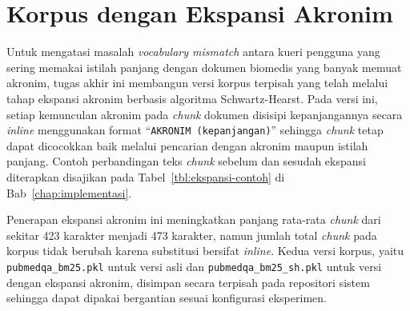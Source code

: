 \section{Korpus dengan Ekspansi Akronim}
\label{lamp:korpus-ekspansi}

Untuk mengatasi masalah \textit{vocabulary mismatch} antara kueri pengguna yang sering memakai istilah panjang dengan dokumen biomedis yang banyak memuat akronim, tugas akhir ini membangun versi korpus terpisah yang telah melalui tahap ekspansi akronim berbasis algoritma Schwartz-Hearst. Pada versi ini, setiap kemunculan akronim pada \textit{chunk} dokumen disisipi kepanjangannya secara \textit{inline} menggunakan format ``\texttt{AKRONIM (kepanjangan)}'' sehingga \textit{chunk} tetap dapat dicocokkan baik melalui pencarian dengan akronim maupun istilah panjang. Contoh perbandingan teks \textit{chunk} sebelum dan sesudah ekspansi diterapkan disajikan pada Tabel~\ref{tbl:ekspansi-contoh} di Bab~\ref{chap:implementasi}.

Penerapan ekspansi akronim ini meningkatkan panjang rata-rata \textit{chunk} dari sekitar 423 karakter menjadi 473 karakter, namun jumlah total \textit{chunk} pada korpus tidak berubah karena substitusi bersifat \textit{inline}. Kedua versi korpus, yaitu \texttt{pubmedqa\_bm25.pkl} untuk versi asli dan \texttt{pubmedqa\_bm25\_sh.pkl} untuk versi dengan ekspansi akronim, disimpan secara terpisah pada repositori sistem sehingga dapat dipakai bergantian sesuai konfigurasi eksperimen.
